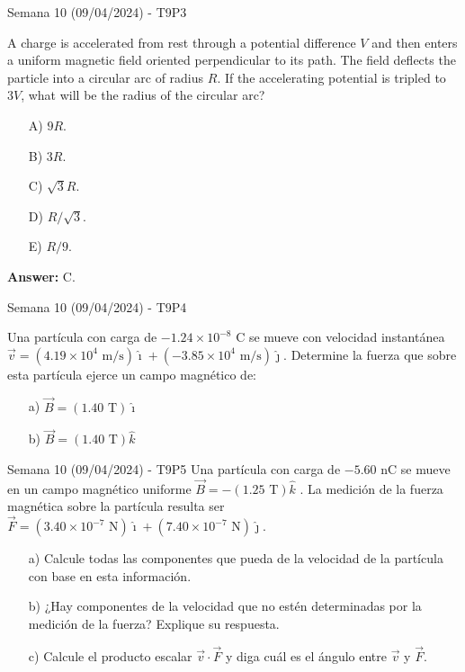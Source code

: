 \begin{frame}{Semana 10 (09/04/2024) - T9P3}
    
    A charge is accelerated from rest through a potential difference $V$ and then enters a uniform magnetic field oriented perpendicular to its path. The field deflects the particle into a circular arc of radius $R$. If the accelerating potential is tripled to $3V$, what will be the radius of the circular arc?
    
    \begin{itemize}
       \item[A)] $9R$.
       \item[B)] $3R$.
       \item[C)] $\sqrt{3}R$.
       \item[D)] $R/\sqrt{3}$.
       \item[E)] $R/9$.
   \end{itemize}
    
    \pause \centering \textbf{Answer:} C.
    
\end{frame}

\begin{frame}{Semana 10 (09/04/2024) - T9P4}
    
    Una partícula con carga de $-1.24 \times10^{-8}$ C se mueve con
velocidad instantánea $\vec{v}= (4.19 \times 10^4 \text{ m/s})\hat{\imath} + (-3.85 \times 10^4 \text{ m/s})\hat{\jmath}$.
Determine la fuerza que sobre esta partícula ejerce un campo magnético de:
\begin{itemize}
    \item[a)] $\vec{B} = (1.40 \text{ T})\hat{\imath}$
    \item[b)] $\vec{B} = (1.40 \text{ T})\hat{k}$
\end{itemize}
    
\end{frame}

\begin{frame}{Semana 10 (09/04/2024) - T9P5}
    Una partícula con carga de $-5.60$ nC se mueve en un
campo magnético uniforme $\vec{B}=-(1.25 \text{ T})\hat{k}$ . La medición de la fuerza magnética sobre la partícula resulta ser $\vec{F}=(3.40 \times 10^{-7} \text{ N})\hat{\imath} + (7.40 \times 10^{-7} \text{ N})\hat{\jmath}$.

\begin{itemize}
    \item[a)] Calcule todas las componentes que pueda de la velocidad de la partícula con base en esta información.
    \item[b)] ¿Hay componentes de la velocidad que no estén determinadas por la medición 
de la fuerza? Explique su respuesta.
    \item[c)] Calcule el producto escalar $\vec{v}\cdot\vec{F}$ y diga cuál es el ángulo entre $\vec{v}$ y $\vec{F}$.
\end{itemize}
\end{frame}

